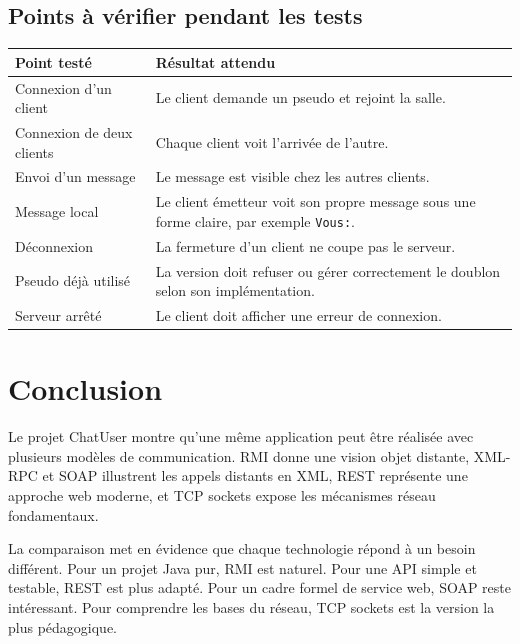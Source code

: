 \documentclass[12pt,a4paper]{report}
\begin{document}
\section{Points à vérifier pendant les tests}

\begin{longtable}{|p{5cm}|p{8cm}|}
\hline
\textbf{Point testé} & \textbf{Résultat attendu} \\
\hline
Connexion d'un client & Le client demande un pseudo et rejoint la salle. \\
\hline
Connexion de deux clients & Chaque client voit l'arrivée de l'autre. \\
\hline
Envoi d'un message & Le message est visible chez les autres clients. \\
\hline
Message local & Le client émetteur voit son propre message sous une forme claire, par exemple \texttt{Vous:}. \\
\hline
Déconnexion & La fermeture d'un client ne coupe pas le serveur. \\
\hline
Pseudo déjà utilisé & La version doit refuser ou gérer correctement le doublon selon son implémentation. \\
\hline
Serveur arrêté & Le client doit afficher une erreur de connexion. \\
\hline
\end{longtable}

\chapter*{Conclusion}

Le projet ChatUser montre qu'une même application peut être réalisée avec plusieurs modèles de communication. RMI donne une vision objet distante, XML-RPC et SOAP illustrent les appels distants en XML, REST représente une approche web moderne, et TCP sockets expose les mécanismes réseau fondamentaux.

La comparaison met en évidence que chaque technologie répond à un besoin différent. Pour un projet Java pur, RMI est naturel. Pour une API simple et testable, REST est plus adapté. Pour un cadre formel de service web, SOAP reste intéressant. Pour comprendre les bases du réseau, TCP sockets est la version la plus pédagogique.
\end{document}
